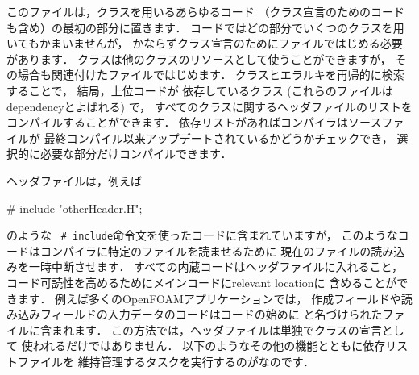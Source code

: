 このファイルは，クラスを用いるあらゆるコード
（クラス宣言のためのコードも含め）の最初の部分に置きます．
コードではどの部分でいくつのクラスを用いてもかまいませんが，
かならずクラス宣言のためにファイルではじめる必要があります．
クラスは他のクラスのリソースとして使うことができますが，
その場合も関連付けたファイルではじめます．
クラスヒエラルキを再帰的に検索することで，
結局，上位コードが
%
依存しているクラス
(これらのファイルはdependencyとよばれる) で，
すべてのクラスに関するヘッダファイルのリストを
コンパイルすることができます．
%
依存リストがあればコンパイラはソースファイルが
最終コンパイル以来アップデートされているかどうかチェックでき，
選択的に必要な部分だけコンパイルできます．

ヘッダファイルは，例えば
\begin{OFverbatim}[file]
# include "otherHeader.H";
\end{OFverbatim}
のような\ 
%
%
\verb|# include|命令文を使ったコードに含まれていますが，
このようなコードはコンパイラに特定のファイルを読ませるために
現在のファイルの読み込みを一時中断させます．
すべての内蔵コードはヘッダファイルに入れること，
コード可読性を高めるためにメインコードにrelevant locationに
含めることができます．
例えば多くのOpenFOAMアプリケーションでは，
作成フィールドや読み込みフィールドの入力データのコードはコードの始めに
と名づけられたファイルに含まれます．
この方法では，ヘッダファイルは単独でクラスの宣言として
使われるだけではありません．
以下のようなその他の機能とともに依存リストファイルを
維持管理するタスクを実行するのがなのです．
